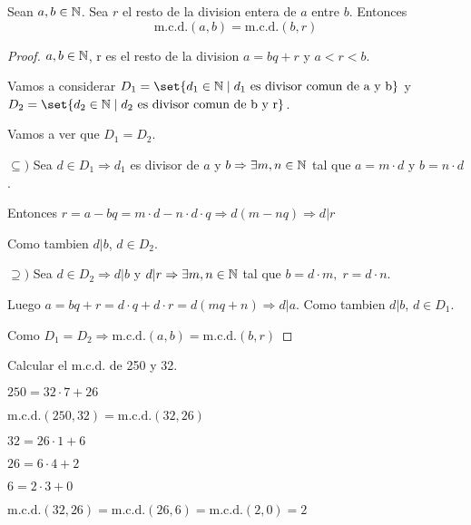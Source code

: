 \begin{proposition}
	\label{mcd}
	Sean \(a,b \in \mathbb{N} \). Sea \(r \) el resto de la division entera de \(a \) entre \(b \). Entonces
	\[
		\mathrm{m.c.d.}(a,b) = \mathrm{m.c.d.}(b,r)
	\]
\end{proposition}

\begin{proof}
	\(a,b \in \mathbb{N} \), r es el resto de la division \(a = bq + r \) y \(a < r < b \).
	
	Vamos a considerar \(D_1 = \set{d_1 \in \N \mid d_1 \text{ es divisor comun de a y b}}\) y \(D_2 = \set{d_2 \in \N \mid d_2 \text{ es divisor comun de b y r}}\).
	
	Vamos a ver que \(D_1 = D_2 \).
	
	\(\subseteq )\) Sea \(d \in D_1 \Rightarrow d_1 \) es divisor de \(a \) y \(b \Rightarrow \exists m,n \in \mathbb{N}\) tal que \(a = m \cdot d \) y \(b = n \cdot d \).
	
	Entonces \(r = a - bq = m \cdot d - n \cdot d \cdot q \Rightarrow d(m - nq) \Rightarrow d | r \)
	
	Como tambien \(d | b \), \(d \in D_2 \).
	
	\(\supseteq ) \) Sea \(d \in D_2 \Rightarrow d | b \) y \(d | r  \Rightarrow \exists m,n \in \mathbb{N}\) tal que \(b = d \cdot m, \; r = d \cdot n \).
	
	Luego \(a = bq + r = d \cdot q + d \cdot r = d (mq + n ) \Rightarrow d | a \). Como tambien \(d | b \), \(d \in D_1 \).
	
	Como \(D_1 = D_2 \Rightarrow \mathrm{m.c.d.}(a,b) = \mathrm{m.c.d.}(b,r)  \)
\end{proof}

\begin{example}
	Calcular el m.c.d. de 250 y 32.
	
	\(250 = 32 \cdot 7 + 26 \)
	
	\(\mathrm{m.c.d.}(250,32) = \mathrm{m.c.d.}(32,26)  \)
	
	\(32 = 26 \cdot 1 + 6 \)
	
	\(26 = 6 \cdot 4 + 2 \)
	
	\(6 = 2 \cdot 3 + 0\)
	
	\(\mathrm{m.c.d.}(32,26) = \mathrm{m.c.d.}(26,6) = \mathrm{m.c.d.}(2,0) = 2  \)
\end{example}

